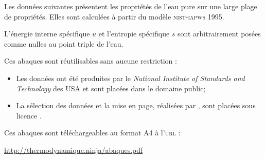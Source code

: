 Les données suivantes présentent les propriétés de l’eau pure sur une large plage de propriétés.
Elles sont calculées à partir du modèle \textsc{nist-iapws} 1995.

L’énergie interne spécifique $u$ et l’entropie spécifique $s$
sont arbitrairement posées comme nulles au point triple de l’eau.

Ces abaques sont réutilisables sans aucune restriction :
\begin{itemize}
	\item Les données ont été produites par le \textit{National Institute of Standards and Technology} des USA et sont placées dans le domaine public;
	\item La sélection des données et la mise en page, réalisées par \olivier, sont placées sous licence \cczero.
\end{itemize}

Ces abaques sont téléchargeables au format A4 à l’\textsc{url} :
\begin{center}\href{http://thermodynamique.ninja/abaques.pdf}{http://thermodynamique.ninja/abaques.pdf}\end{center}
